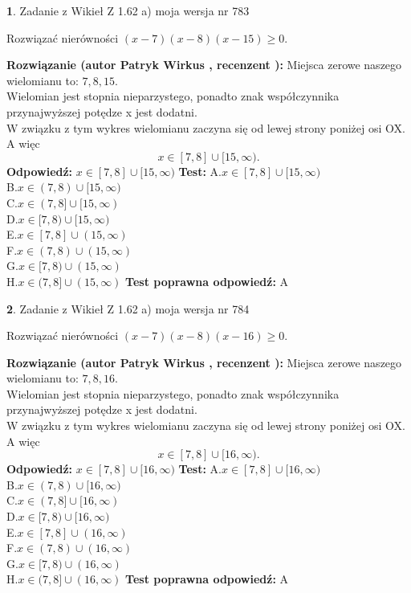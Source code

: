 \documentclass[12pt, a4paper]{article}
\theoremstyle{definition} %
\newtheorem{zad}{}
\newcommand{\zadStart}[1]{\begin{zad}#1\newline}
\newcommand{\zadStop}{\end{zad}}
\newcommand{\rozwStart}[2]{\noindent \textbf{Rozwiązanie (autor #1 , recenzent #2): }\newline}
\newcommand{\rozwStop}{\newline}
\newcommand{\odpStart}{\noindent \textbf{Odpowiedź:}\newline}
\newcommand{\odpStop}{\newline}
\newcommand{\testStart}{\noindent \textbf{Test:}\newline}
\newcommand{\testStop}{\newline}
\newcommand{\kluczStart}{\noindent \textbf{Test poprawna odpowiedź:}\newline}
\newcommand{\kluczStop}{\newline}
\begin{document}
\zadStart{Zadanie z Wikieł Z 1.62 a) moja wersja nr 783}

Rozwiązać nierówności $(x-7)(x-8)(x-15)\ge0$.
\zadStop
\rozwStart{Patryk Wirkus}{}
Miejsca zerowe naszego wielomianu to: $7, 8, 15$.\\
Wielomian jest stopnia nieparzystego, ponadto znak współczynnika przy\linebreak najwyższej potędze x jest dodatni.\\ W związku z tym wykres wielomianu zaczyna się od lewej strony poniżej osi OX. A więc $$x \in [7,8] \cup [15,\infty).$$
\rozwStop
\odpStart
$x \in [7,8] \cup [15,\infty)$
\odpStop
\testStart
A.$x \in [7,8] \cup [15,\infty)$\\
B.$x \in (7,8) \cup [15,\infty)$\\
C.$x \in (7,8] \cup [15,\infty)$\\
D.$x \in [7,8) \cup [15,\infty)$\\
E.$x \in [7,8] \cup (15,\infty)$\\
F.$x \in (7,8) \cup (15,\infty)$\\
G.$x \in [7,8) \cup (15,\infty)$\\
H.$x \in (7,8] \cup (15,\infty)$
\testStop
\kluczStart
A
\kluczStop



\zadStart{Zadanie z Wikieł Z 1.62 a) moja wersja nr 784}

Rozwiązać nierówności $(x-7)(x-8)(x-16)\ge0$.
\zadStop
\rozwStart{Patryk Wirkus}{}
Miejsca zerowe naszego wielomianu to: $7, 8, 16$.\\
Wielomian jest stopnia nieparzystego, ponadto znak współczynnika przy\linebreak najwyższej potędze x jest dodatni.\\ W związku z tym wykres wielomianu zaczyna się od lewej strony poniżej osi OX. A więc $$x \in [7,8] \cup [16,\infty).$$
\rozwStop
\odpStart
$x \in [7,8] \cup [16,\infty)$
\odpStop
\testStart
A.$x \in [7,8] \cup [16,\infty)$\\
B.$x \in (7,8) \cup [16,\infty)$\\
C.$x \in (7,8] \cup [16,\infty)$\\
D.$x \in [7,8) \cup [16,\infty)$\\
E.$x \in [7,8] \cup (16,\infty)$\\
F.$x \in (7,8) \cup (16,\infty)$\\
G.$x \in [7,8) \cup (16,\infty)$\\
H.$x \in (7,8] \cup (16,\infty)$
\testStop
\kluczStart
A
\kluczStop
\end{document}
